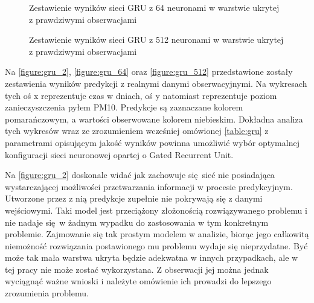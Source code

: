 \documentclass[10pt,a4paper]{article}
\begin{document}
\FloatBarrier
\begin{figure}[!ht]
	\centering
	\caption{Zestawienie wyników sieci GRU z 64 neuronami w warstwie ukrytej z prawdziwymi obserwacjami}
	\label{figure:gru_64}
\end{figure}
\FloatBarrier
\begin{figure}[!ht]
	\centering
	\caption{Zestawienie wyników sieci GRU z 512 neuronami w warstwie ukrytej z prawdziwymi obserwacjami}
	\label{figure:gru_512}
\end{figure}
\FloatBarrier

Na \autoref{figure:gru_2}, \autoref{figure:gru_64} oraz \autoref{figure:gru_512} przedstawione zostały zestawienia wyników predykcji z realnymi danymi obserwacyjnymi. Na wykresach tych oś x reprezentuje czas w dniach, oś y natomiast reprezentuje poziom zanieczyszczenia pyłem PM10. Predykcje są zaznaczane kolorem pomarańczowym, a wartości obserwowane kolorem niebieskim. Dokładna analiza tych wykresów wraz ze zrozumieniem wcześniej omówionej \autoref{table:gru} z parametrami opisującym jakość wyników powinna umożliwić wybór optymalnej konfiguracji sieci neuronowej opartej o Gated Recurrent Unit.

Na \autoref{figure:gru_2} doskonale widać jak zachowuje się sieć nie posiadająca wystarczającej możliwości przetwarzania informacji w procesie predykcyjnym. Utworzone przez z nią predykcje zupełnie nie pokrywają się z danymi wejściowymi. Taki model jest przeciążony złożonością rozwiązywanego problemu i nie nadaje się w żadnym wypadku do zastosowania w tym konkretnym problemie. Zajmowanie się tak prostym modelem w analizie, biorąc jego całkowitą niemożność rozwiązania postawionego mu problemu wydaje się nieprzydatne. Być może tak mała warstwa ukryta będzie adekwatna w innych przypadkach, ale w tej pracy nie może zostać wykorzystana. Z obserwacji jej można jednak wyciągnąć ważne wnioski i należyte omówienie ich prowadzi do lepszego zrozumienia problemu. 
\end{document}
